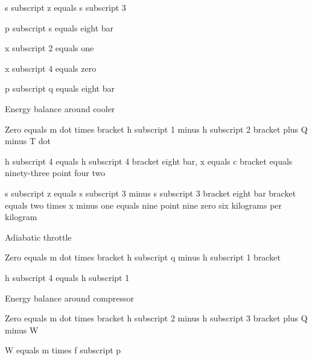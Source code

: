 s subscript z equals s subscript 3

p subscript s equals eight bar

x subscript 2 equals one

x subscript 4 equals zero

p subscript q equals eight bar

Energy balance around cooler

Zero equals m dot times bracket h subscript 1 minus h subscript 2 bracket plus Q minus T dot

h subscript 4 equals h subscript 4 bracket eight bar, x equals c bracket equals ninety-three point four two

s subscript z equals s subscript 3 minus s subscript 3 bracket eight bar bracket equals two times x minus one equals nine point nine zero six kilograms per kilogram

Adiabatic throttle

Zero equals m dot times bracket h subscript q minus h subscript 1 bracket

h subscript 4 equals h subscript 1

Energy balance around compressor

Zero equals m dot times bracket h subscript 2 minus h subscript 3 bracket plus Q minus W

W equals m times f subscript p